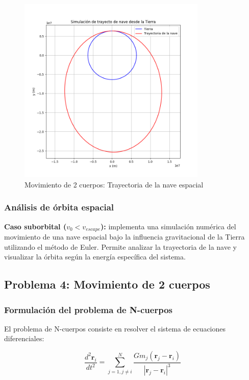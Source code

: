 \documentclass{article}
\begin{document}
\begin{center}
    \begin{figure}[H]
    \centering
    \includegraphics[width=0.8\textwidth]{img/3.png}
    \caption{Movimiento de 2 cuerpos: Trayectoria de la nave espacial}
    \label{fig:salida_consola}
\end{figure}

	\subsubsection{Análisis de órbita espacial}
	
	\textbf{Caso suborbital ($v_0 < v_{escape}$):}
	implementa una simulación numérica del movimiento de una nave espacial bajo la influencia gravitacional de la Tierra utilizando el método de Euler. Permite analizar la trayectoria de la nave  y visualizar la órbita según la energía específica del sistema.

	\subsection{Problema 4: Movimiento de 2 cuerpos}
	
	\subsubsection{Formulación del problema de N-cuerpos}
	
	El problema de N-cuerpos consiste en resolver el sistema de ecuaciones diferenciales:
	
	\begin{equation}
		\frac{d^2\mathbf{r}_i}{dt^2} = \sum_{j=1, j \neq i}^{N} \frac{Gm_j(\mathbf{r}_j - \mathbf{r}_i)}{|\mathbf{r}_j - \mathbf{r}_i|^3}
	\end{equation}
	

\end{center}
\end{document}
